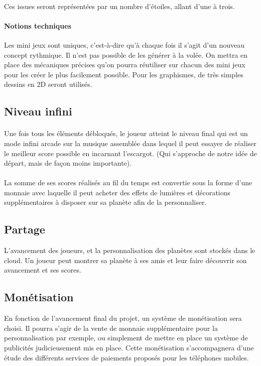 \paragraph{}
Ces issues seront représentées par un nombre d'étoiles, allant d’une à trois.

\paragraph{Notions techniques}
Les mini jeux sont uniques, c’est-à-dire qu’à chaque fois il s’agit d’un nouveau concept rythmique. Il n’est pas possible de les générer à la volée. On mettra en place des mécaniques précises qu’on pourra réutiliser sur chacun des mini jeux pour les créer le plus facilement possible. Pour les graphismes, de très simples dessins en 2D seront utilisés. 

\subsection{Niveau infini}
\paragraph{} Une fois tous les éléments débloqués, le joueur atteint le niveau final qui est un mode infini arcade sur la musique assemblée dans lequel il peut essayer de réaliser le meilleur score possible en incarnant l’escargot. (Qui s’approche de notre idée de départ, mais de façon moins importante).

\paragraph{} La somme de ses scores réalisés au fil du temps est convertie sous la forme d’une monnaie avec laquelle il peut acheter des effets de lumières et décorations supplémentaires à disposer sur sa planète afin de la personnaliser.

\subsection{Partage}
L’avancement des joueurs, et la personnalisation des planètes sont stockés dans le cloud. Un joueur peut montrer sa planète à ses amis et leur faire découvrir son avancement et ses scores.

\subsection{Monétisation}
En fonction de l’avancement final du projet, un système de monétisation sera choisi. Il pourra s’agir de la vente de monnaie supplémentaire pour la personnalisation par exemple, ou simplement de mettre en place un système de publicités judicieusement mis en place. Cette monétisation s'accompagnera d'une étude des différents services de paiements proposés pour les téléphones mobiles.

